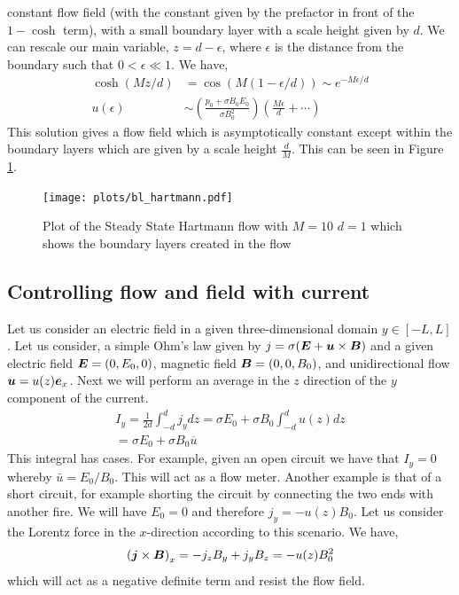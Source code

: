 \documentclass{article}
\begin{document}
constant flow field (with the constant given by the prefactor in front of the $1
- \cosh$ term), with a small boundary layer with a scale height given by $d$. We
can rescale our main variable, $z = d - \epsilon$, where $\epsilon$ is the
distance from the boundary such that $0 < \epsilon \ll 1$. We have, 
\begin{align*}
    \cosh(Mz/d) &= \cos\left(M(1 - \epsilon/d)\right) \sim e^{-M\epsilon/d}\\
    u(\epsilon) &\sim \left(\frac{p_0 + \sigma B_0E_0}{\sigma
    B_0^2}\right)\left(\frac{M\epsilon}{d} + \cdots\right)
\end{align*}
This solution gives a flow field which is asymptotically constant except within
the boundary layers which are given by a scale height $\frac{d}{M}$. This can be
seen in Figure \ref{fig:hartmann}. 
\begin{figure}
    \centering
    \texttt{[image: plots/bl\_hartmann.pdf]}
    \caption{Plot of the Steady State Hartmann flow with $M = 10$ $d = 1$ which
    shows the boundary layers created in the flow}
    \label{fig:hartmann}
\end{figure}

\subsection{Controlling flow and field with current}

Let us consider an electric field in a given three-dimensional domain $y \in
[-L, L]$. Let us consider, a simple Ohm's law given by $j = \sigma(\boldsymbol{E} + \boldsymbol{u}
\times \boldsymbol{B})$ and a given electric field $\boldsymbol{E} = (0, E_0, 0)$, magnetic field $\boldsymbol{B} =
(0, 0, B_0)$, and  unidirectional flow
$\boldsymbol{u} = u(z)\boldsymbol{e}_x$. Next we will perform an
average in the $z$ direction of the $y$ component of the current. 
\begin{gather*}
    I_y = \frac{1}{2d}\int_{-d}^{d} j_y dz = \sigma E_0 + \sigma
    B_0\int_{-d}^{d} u(z)dz\\
    = \sigma E_0 + \sigma
    B_0\overline{u}
\end{gather*}
This integral has cases. For example, given an open circuit we have that $I_y =
0$ whereby $\bar{u} = E_0/B_0$. This will act as a flow meter. Another example
is that of a short circuit, for example shorting the circuit by connecting the
two ends with another fire. We will have $E_0 = 0$ and therefore $j_y =
-u(z)B_0$. Let us consider the Lorentz force in the $x$-direction according to
this scenario. We have, 
\begin{gather*}
    \left(\boldsymbol{j}\times\boldsymbol{B}\right)_x = -j_zB_y + j_yB_z = -u(z)B_0^2
\end{gather*}
which will act as a negative definite term and resist the flow field. 
\end{document}
